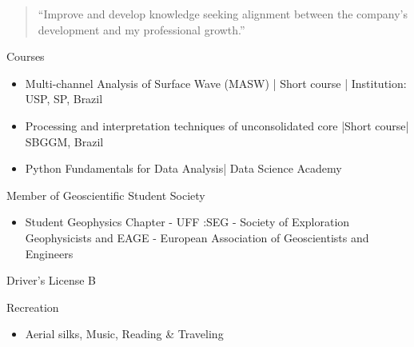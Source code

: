 \begin{quote}
``Improve and develop knowledge seeking alignment between the company's development and my professional growth.''
\end{quote}





\divider\smallskip












 \faBook \space  Courses
  \begin{itemize}
      \item Multi-channel Analysis of Surface Wave (MASW) | Short course | Institution: USP, SP, Brazil
      \item Processing and interpretation techniques of unconsolidated core |Short course| SBGGM, Brazil
      \item Python Fundamentals for Data Analysis| Data Science Academy 
  \end{itemize}
  \divider
 
  \faGraduationCap \pace \sapce  Member of Geoscientific Student Society 
    \begin{itemize}
        \item Student Geophysics Chapter - UFF :SEG - Society of Exploration Geophysicists and EAGE - European Association of Geoscientists and Engineers
    \end{itemize}
    
\divider
    
    
 \faCar \space \space Driver’s License B


    \divider
  
  \faHandPeaceO \space \space Recreation
  \begin{itemize}
        \item Aerial silks, Music, Reading \& Traveling
    \end{itemize}
  
